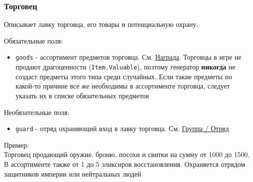 \subsubsection{Торговец}
\label{merchant}
Описывает лавку торговца, его товары и потенциальную охрану.

Обязательные поля:
\begin{itemize}
\item \texttt{goods} - ассортимент предметов торговца. См. \hyperref[loot]{Награда}. Торговцы в игре не продают драгоценности (\texttt{Item.Valuable}), поэтому генератор \textbf{никогда} не создаст предметы этого типа среди случайных. Если такие предметы по какой-то причине все же необходимы в ассортименте торговца, следует указать их в списке обязательных предметов
\end{itemize}

Необязательные поля:
\begin{itemize}
\item \texttt{guard} - отряд охраняющий вход в лавку торговца. См. \hyperref[group]{Группа / Отряд}
\end{itemize}

Пример:\\
Торговец продающий оружие, броню, посохи и свитки на сумму от 1000 до 1500.
В ассортименте также от 1 до 5 эликсиров восстановления.
Охраняется отрядом защитников империи или нейтральных людей

\begin{figure}[H]

\end{figure}